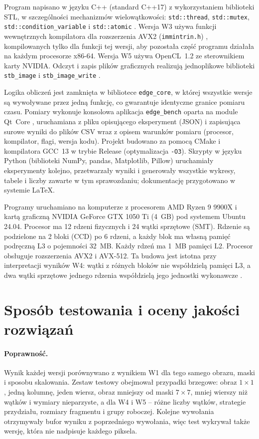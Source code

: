 \documentclass[12pt,a4paper]{article}
\newcommand{\kod}[1]{\texttt{#1}}
\begin{document}
Program napisano w języku C++ (standard C++17) z wykorzystaniem biblioteki STL, w szczególności mechanizmów wielowątkowości: \kod{std::thread}, \kod{std::mutex}, \kod{std::condition\_variable} i \kod{std::atomic} \cite{williams,cppreference}. Wersja W3 używa funkcji wewnętrznych kompilatora dla rozszerzenia AVX2 (\kod{immintrin.h}) \cite{intel}, kompilowanych tylko dla funkcji tej wersji, aby pozostała część programu działała na każdym procesorze x86-64. Wersja W5 używa OpenCL~1.2 ze sterownikiem karty NVIDIA. Odczyt i zapis plików graficznych realizują jednoplikowe biblioteki \kod{stb\_image} i \kod{stb\_image\_write} \cite{stb}.

Logika obliczeń jest zamknięta w bibliotece \kod{edge\_core}, w której wszystkie wersje są wywoływane przez jedną funkcję, co gwarantuje identyczne granice pomiaru czasu. Pomiary wykonuje konsolowa aplikacja \kod{edge\_bench} oparta na module Qt~Core \cite{qt}, uruchamiana z pliku opisującego eksperyment (JSON) i zapisująca surowe wyniki do plików CSV wraz z opisem warunków pomiaru (procesor, kompilator, flagi, wersja kodu). Projekt budowano za pomocą CMake i kompilatora GCC~13 w trybie Release (optymalizacja \kod{-O3}). Skrypty w języku Python (biblioteki NumPy, pandas, Matplotlib, Pillow) uruchamiały eksperymenty kolejno, przetwarzały wyniki i generowały wszystkie wykresy, tabele i liczby zawarte w tym sprawozdaniu; dokumentację przygotowano w systemie \LaTeX.

Programy uruchamiano na komputerze z procesorem AMD Ryzen 9 9900X i kartą graficzną NVIDIA GeForce GTX 1050 Ti (4~GB) pod systemem Ubuntu 24.04. Procesor ma 12 rdzeni fizycznych i 24 wątki sprzętowe (SMT). Rdzenie są podzielone na 2 bloki (CCD) po 6 rdzeni, a każdy blok ma własną pamięć podręczną L3 o pojemności 32~MB. Każdy rdzeń ma 1~MB pamięci L2. Procesor obsługuje rozszerzenia AVX2 i AVX-512. Ta budowa jest istotna przy interpretacji wyników W4: wątki z różnych bloków nie współdzielą pamięci L3, a dwa wątki sprzętowe jednego rdzenia współdzielą jego jednostki wykonawcze \cite{silberschatz}.

\section{Sposób testowania i oceny jakości rozwiązań}
\label{sec:testy}

\paragraph{Poprawność.} Wynik każdej wersji porównywano z wynikiem W1 dla tego samego obrazu, maski i sposobu skalowania. Zestaw testowy obejmował przypadki brzegowe: obraz $1 \times 1$, jedną kolumnę, jeden wiersz, obraz mniejszy od maski $7\times7$, mniej wierszy niż wątków i wymiary nieparzyste, a dla W4 i W5 -- różne liczby wątków, strategie przydziału, rozmiary fragmentu i grupy roboczej. Kolejne wywołania otrzymywały bufor wyniku z poprzedniego wywołania, więc test wykrywał także wersję, która nie nadpisuje każdego piksela.
\end{document}
